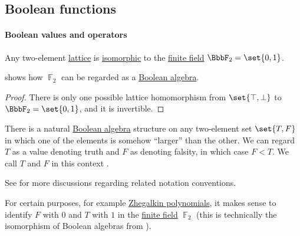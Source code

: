 \subsection{Boolean functions}\label{subsec:boolean_functions}

\paragraph{Boolean values and operators}

\begin{proposition}\label{thm:two_element_lattice}
  Any two-element \hyperref[def:lattice]{lattice} is \hyperref[def:lattice/homomorphism]{isomorphic} to the \hyperref[def:finite_field]{finite field} \( \BbbF_2 = \set{ 0, 1 } \).
\end{proposition}
\begin{comments}
  \item {} shows how \( \BbbF_2 \) can be regarded as a \hyperref[def:boolean_algebra]{Boolean algebra}.
\end{comments}
\begin{proof}
  There is only one possible lattice homomorphism from \( \set{ \top, \bot } \) to \( \BbbF_2 = \set{ 0, 1 } \), and it is invertible.
\end{proof}

\begin{definition}\label{def:boolean_value}\mimprovised
  There is a natural \hyperref[def:boolean_algebra]{Boolean algebra} structure on any two-element set \( \set{ T, F } \) in which one of the elements is somehow \enquote{larger} than the other. We can regard \( T \) as a value denoting truth and \( F \) as denoting falsity, in which case \( F < T \). We call \( T \) and \( F \) in this context .
\end{definition}
\begin{comments}
  \item See  for more discussions regarding related notation conventions.

  \item For certain purposes, for example \hyperref[def:zhegalkin_polynomial]{Zhegalkin polynomials}, it makes sense to identify \( F \) with \( 0 \) and \( T \) with \( 1 \) in the \hyperref[def:finite_field]{finite field} \( \BbbF_2 \) (this is technically the isomorphism of Boolean algebras from ).
\end{comments}

